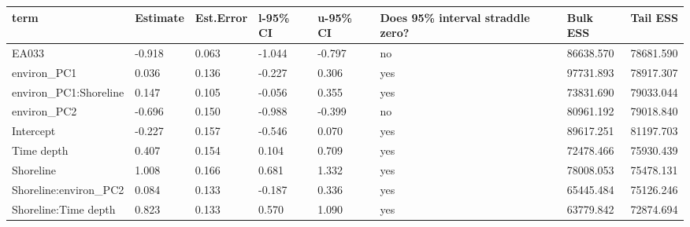 \begin{tabular}{p{5cm}p{2cm}p{2cm}p{2cm}p{2cm}p{2cm}p{2cm}p{2cm}}
  \toprule
term & Estimate & Est.Error & l-95\% CI & u-95\% CI & Does 95\% interval straddle zero? & Bulk ESS & Tail ESS \\ 
  \midrule
EA033 & -0.918 & 0.063 & -1.044 & -0.797 & no & 86638.570 & 78681.590 \\ 
  environ\_PC1 & 0.036 & 0.136 & -0.227 & 0.306 & yes & 97731.893 & 78917.307 \\ 
  environ\_PC1:Shoreline & 0.147 & 0.105 & -0.056 & 0.355 & yes & 73831.690 & 79033.044 \\ 
  environ\_PC2 & -0.696 & 0.150 & -0.988 & -0.399 & no & 80961.192 & 79018.840 \\ 
  Intercept & -0.227 & 0.157 & -0.546 & 0.070 & yes & 89617.251 & 81197.703 \\ 
  Time depth & 0.407 & 0.154 & 0.104 & 0.709 & yes & 72478.466 & 75930.439 \\ 
  Shoreline & 1.008 & 0.166 & 0.681 & 1.332 & yes & 78008.053 & 75478.131 \\ 
  Shoreline:environ\_PC2 & 0.084 & 0.133 & -0.187 & 0.336 & yes & 65445.484 & 75126.246 \\ 
  Shoreline:Time depth & 0.823 & 0.133 & 0.570 & 1.090 & yes & 63779.842 & 72874.694 \\ 
   \bottomrule
\end{tabular}
